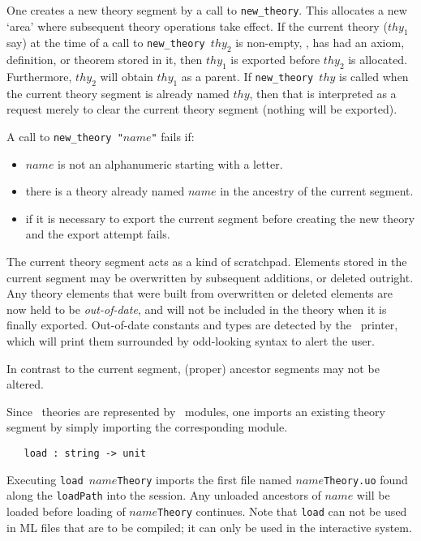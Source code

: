 \noindent One creates a new theory segment by a call to
\verb+new_theory+.  This allocates a new `area' where subsequent theory
operations take effect. If the current theory ($thy_1$ say) at the time
of a call to {\small\verb+new_theory +}$thy_2$ is non-empty, \ie, has
had an axiom, definition, or theorem stored in it, then $thy_1$ is
exported before $thy_2$ is allocated. Furthermore, $thy_2$ will obtain
$thy_1$ as a parent. If {\small\verb+new_theory +}$thy$ is called when
the current theory segment is already named $thy$, then that is
interpreted as a request merely to clear the current theory segment
(nothing will be exported).

A call to {\small\verb+new_theory "+}$name${\small\verb+"+} fails if:
\begin{itemize}

\item $name$ is not an alphanumeric starting with a letter.

\item there is a theory already named $name$ in the ancestry of the
current segment.

\item if it is necessary to export the current segment before creating
the new theory and the export attempt fails.

\end{itemize}

The current theory segment acts as a kind of scratchpad. Elements stored
in the current segment may be overwritten by subsequent additions, or
deleted outright. Any theory elements that were built from overwritten
or deleted elements are now held to be {\it out-of-date}, and will not
be included in the theory when it is finally exported.  Out-of-date
constants and types are detected by the \HOL\ printer, which will print
them surrounded by odd-looking syntax to alert the user.

In contrast to the current segment, (proper) ancestor segments may not
be altered.

Since \HOL\ theories are represented by \ML\ modules, one imports an
existing theory segment by simply importing the corresponding module.

\begin{boxed}
\begin{verbatim}
   load : string -> unit
\end{verbatim}\end{boxed}

\noindent
Executing {\small\verb+load +}$name${\small\verb+Theory+} imports the
first file named $name${\small\verb+Theory.uo+} found along the
{\small\verb+loadPath+} into the session. Any unloaded ancestors of
$name$ will be loaded before loading of $name${\small\verb+Theory+}
continues.  Note that {\small\verb+load+} can not be used in ML files
that are to be compiled; it can only be used in the interactive
system.

